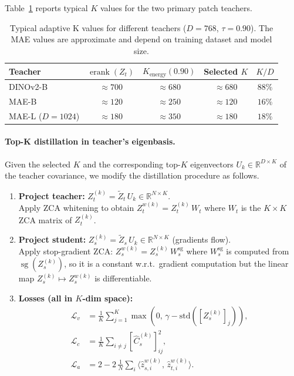 \documentclass[11pt,a4paper]{article}
\newcommand{\R}{\mathbb{R}}
\newcommand{\calL}{\mathcal{L}}
\begin{document}
Table~\ref{tab:k_values} reports typical $K$ values for the two primary patch
teachers.

\begin{table}[h]
\centering
\caption{Typical adaptive K values for different teachers ($D=768$, $\tau=0.90$).
The MAE values are approximate and depend on training dataset and model size.}
\label{tab:k_values}
\begin{tabular}{lcccc}
\toprule
Teacher & $\operatorname{erank}(Z_t)$ & $K_\text{energy}(0.90)$ & Selected $K$ & $K/D$ \\
\midrule
DINOv2-B  & $\approx 700$  & $\approx 680$ & $\approx 680$ & $88\%$ \\
MAE-B     & $\approx 120$  & $\approx 250$ & $\approx 120$ & $16\%$ \\
MAE-L ($D{=}1024$) & $\approx 180$ & $\approx 350$ & $\approx 180$ & $18\%$ \\
\bottomrule
\end{tabular}
\end{table}

\paragraph{Top-K distillation in teacher's eigenbasis.}
Given the selected $K$ and the corresponding top-$K$ eigenvectors
$U_k \in \R^{D \times K}$ of the teacher covariance, we modify the distillation
procedure as follows.

\begin{enumerate}
    \item \textbf{Project teacher:}
          $Z_t^{(k)} = \tilde{Z}_t\, U_k \in \R^{N \times K}$. \\
          Apply ZCA whitening to obtain $Z_t^{w(k)} = Z_t^{(k)}\, W_t$
          where $W_t$ is the $K \times K$ ZCA matrix of $Z_t^{(k)}$.

    \item \textbf{Project student:}
          $Z_s^{(k)} = \tilde{Z}_s\, U_k \in \R^{N \times K}$ (gradients flow). \\
          Apply stop-gradient ZCA: $Z_s^{w(k)} = Z_s^{(k)}\, W_s^{\mathrm{sg}}$
          where $W_s^{\mathrm{sg}}$ is computed from $\operatorname{sg}(Z_s^{(k)})$,
          so it is a constant w.r.t.\ gradient computation but the linear map
          $Z_s^{(k)} \mapsto Z_s^{w(k)}$ is differentiable.

    \item \textbf{Losses (all in $K$-dim space):}
          \begin{align}
              \calL_v &= \textstyle\frac{1}{K}\sum_{j=1}^K \max(0,\,\gamma - \mathrm{std}([Z_s^{(k)}]_j)),
              \label{eq:var_topk} \\
              \calL_c &= \textstyle\frac{1}{K}\sum_{i \ne j} [\hat C_s^{(k)}]_{ij}^2,
              \label{eq:cov_topk} \\
              \calL_a &= 2 - 2\,\textstyle\frac{1}{N}\sum_i
              \langle \hat z_{s,i}^{w(k)},\, \hat z_{t,i}^{w(k)}\rangle.
              \label{eq:align_topk}
          \end{align}
\end{enumerate}
\end{document}
